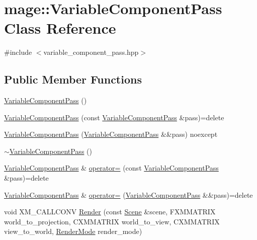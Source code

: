 \hypertarget{classmage_1_1_variable_component_pass}{}\section{mage\+:\+:Variable\+Component\+Pass Class Reference}
\label{classmage_1_1_variable_component_pass}


{\ttfamily \#include $<$variable\+\_\+component\+\_\+pass.\+hpp$>$}

\subsection*{Public Member Functions}
\begin{DoxyCompactItemize}
\item 
\hyperlink{classmage_1_1_variable_component_pass_a86224a1702761665451b3c6e78557261}{Variable\+Component\+Pass} ()
\item 
\hyperlink{classmage_1_1_variable_component_pass_aca4507c50e2c05f36ba18801f91e6928}{Variable\+Component\+Pass} (const \hyperlink{classmage_1_1_variable_component_pass}{Variable\+Component\+Pass} \&pass)=delete
\item 
\hyperlink{classmage_1_1_variable_component_pass_acda2d913a1beefc3772e5fc70c48c4ab}{Variable\+Component\+Pass} (\hyperlink{classmage_1_1_variable_component_pass}{Variable\+Component\+Pass} \&\&pass) noexcept
\item 
\hyperlink{classmage_1_1_variable_component_pass_addf03c307a88e6a1871f0ec3adbb8bcb}{$\sim$\+Variable\+Component\+Pass} ()
\item 
\hyperlink{classmage_1_1_variable_component_pass}{Variable\+Component\+Pass} \& \hyperlink{classmage_1_1_variable_component_pass_a15302946b83ff045f52f0429163fd916}{operator=} (const \hyperlink{classmage_1_1_variable_component_pass}{Variable\+Component\+Pass} \&pass)=delete
\item 
\hyperlink{classmage_1_1_variable_component_pass}{Variable\+Component\+Pass} \& \hyperlink{classmage_1_1_variable_component_pass_a6d165ef4a6e1cb43035fd6a14197b542}{operator=} (\hyperlink{classmage_1_1_variable_component_pass}{Variable\+Component\+Pass} \&\&pass)=delete
\item 
void X\+M\+\_\+\+C\+A\+L\+L\+C\+O\+NV \hyperlink{classmage_1_1_variable_component_pass_aa77a1793a8b6e617f25473d98681a58f}{Render} (const \hyperlink{classmage_1_1_scene}{Scene} \&scene, F\+X\+M\+M\+A\+T\+R\+IX world\+\_\+to\+\_\+projection, C\+X\+M\+M\+A\+T\+R\+IX world\+\_\+to\+\_\+view, C\+X\+M\+M\+A\+T\+R\+IX view\+\_\+to\+\_\+world, \hyperlink{namespacemage_a9d24b35ed0bdecf8535e2b91fe0eebba}{Render\+Mode} render\+\_\+mode)
\end{DoxyCompactItemize}
